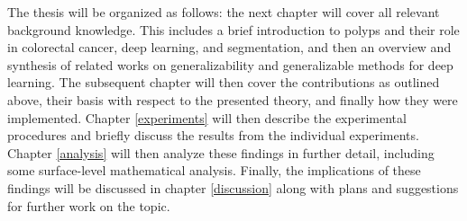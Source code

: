     The thesis will be organized as follows: the next chapter will cover all relevant background knowledge. This includes a brief introduction to polyps and their role in colorectal cancer, deep learning, and segmentation, and then an overview and synthesis of related works on generalizability and generalizable methods for deep learning. The subsequent chapter will then cover the contributions as outlined above, their basis with respect to the presented theory, and finally how they were implemented. Chapter \ref{experiments} will then describe the experimental procedures and briefly discuss the results from the individual experiments. Chapter \ref{analysis} will then analyze these findings in further detail, including some surface-level mathematical analysis. Finally, the implications of these findings will be discussed in chapter \ref{discussion} along with plans and suggestions for further work on the topic. 